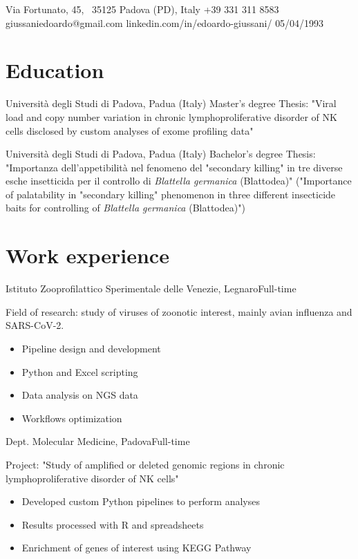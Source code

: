 \documentclass{fancy_cv}
\author{Edoardo Giussani}
\begin{document}
    {Via Fortunato, 45, \ 35125 Padova (PD), Italy}
    {+39 331 311 8583}
    {giussaniedoardo@gmail.com}
    {linkedin.com/in/edoardo-giussani/}
    {05/04/1993}

    \section{Education}
            {Università degli Studi di Padova, Padua (Italy)} {Master's degree}
            {Thesis: "Viral load and copy number variation in chronic 
            lymphoproliferative disorder of NK cells disclosed by custom analyses
            of exome profiling data"}
        \medskip

            {Università degli Studi di Padova, Padua (Italy)} {Bachelor's degree}
            {Thesis: "Importanza dell'appetibilità nel fenomeno del "secondary 
            killing" in tre diverse esche insetticida per il controllo
            di \textit{Blattella germanica} (Blattodea)" \bullet
            ("Importance of palatability in "secondary killing" phenomenon in three different insecticide baits 
            for controlling of \textit{Blattella germanica} (Blattodea)")}


    \section{Work experience}
        {Istituto Zooprofilattico Sperimentale delle Venezie, Legnaro}{Full-time}
        {Field of research: study of viruses of zoonotic interest, mainly avian influenza and SARS-CoV-2.
        \begin{itemize}
            \item Pipeline design and development
            \item Python and Excel scripting
            \item Data analysis on NGS data
            \item Workflows optimization 
        \end{itemize}}
        \medskip

        {Dept. Molecular Medicine, Padova}{Full-time}
        {Project: "Study of amplified or deleted genomic regions in chronic 
        lymphoproliferative disorder of NK cells"
        \begin{itemize}
            \item Developed custom Python pipelines to perform analyses
            \item Results processed with R and spreadsheets
            \item Enrichment of genes of interest using KEGG Pathway
        \end{itemize}}
        \medskip
\end{document}
